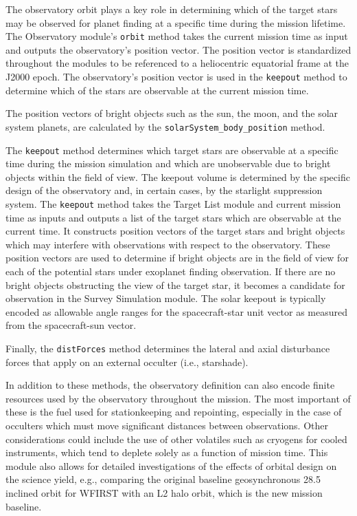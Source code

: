 \documentclass[cleanfoot]{asme2ej}
\begin{document}
The observatory orbit plays a key role in determining which of the target stars may be observed for planet finding at a specific time during the mission lifetime. The Observatory module's \verb+orbit+ method takes the current mission time as input and outputs the observatory's position vector. The position vector is standardized throughout the modules to be referenced to a heliocentric equatorial frame at the J2000 epoch. The observatory's position vector is used in the \verb+keepout+ method to determine which of the stars are observable at the current mission time.

The position vectors of bright objects such as the sun, the moon, and the solar system planets, are calculated by the \verb+solarSystem_body_position+ method. 

The \verb+keepout+ method determines which target stars are observable at a specific time during the mission simulation and which are unobservable due to bright objects within the field of view. The keepout volume is determined by the specific design of the observatory and, in certain cases, by the starlight suppression system.  The \verb+keepout+ method takes the Target List module and current mission time as inputs and outputs a list of the target stars which are observable at the current time. It constructs position vectors of the target stars and bright objects which may interfere with observations with respect to the observatory. These position vectors are used to determine if bright objects are in the field of view for each of the potential stars under exoplanet finding observation.  If there are no bright objects obstructing the view of the target star, it becomes a candidate for observation in the Survey Simulation module.  The solar keepout is typically encoded as allowable angle ranges for the spacecraft-star unit vector as measured from the spacecraft-sun vector.

Finally, the \verb+distForces+ method determines the lateral and axial disturbance forces that apply on an external occulter (i.e., starshade).

In addition to these methods, the observatory definition can also encode finite resources used by the observatory throughout the mission.  The most important of these is the fuel used for stationkeeping and repointing, especially in the case of occulters which must move significant distances between observations.  Other considerations could include the use of other volatiles such as cryogens for cooled instruments, which tend to deplete solely as a function of mission time.  This module also allows for detailed investigations of the effects of orbital design on the science yield, e.g., comparing the original baseline geosynchronous 28.5\textdegree{} inclined orbit for WFIRST with an L2 halo orbit, which is the new mission baseline. 
\end{document}

